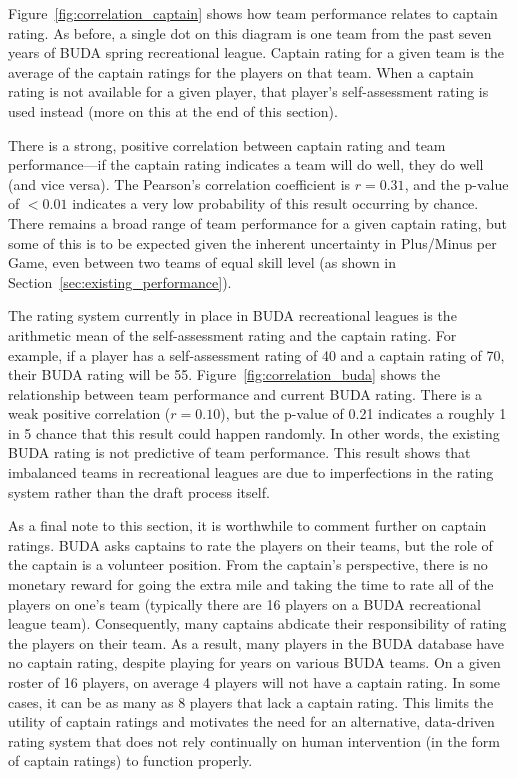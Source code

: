 Figure~\ref{fig:correlation_captain} shows how team performance relates to captain rating.  As before, a single dot on this diagram is one team from the past seven years of BUDA spring recreational league.  Captain rating for a given team is the average of the captain ratings for the players on that team. When a captain rating is not available for a given player, that player's self-assessment rating is used instead (more on this at the end of this section).

There is a strong, positive correlation between captain rating and team performance---if the captain rating indicates a team will do well, they do well (and vice versa). The Pearson's correlation coefficient is $r = 0.31$, and the p-value of $<0.01$ indicates a very low probability of this result occurring by chance. There remains a broad range of team performance for a given captain rating, but some of this is to be expected given the inherent uncertainty in Plus/Minus per Game, even between two teams of equal skill level (as shown in Section~\ref{sec:existing_performance}).

The rating system currently in place in BUDA recreational leagues is the arithmetic mean of the self-assessment rating and the captain rating.  For example, if a player has a self-assessment rating of 40 and a captain rating of 70, their BUDA rating will be 55. Figure~\ref{fig:correlation_buda} shows the relationship between team performance and current BUDA rating. There is a weak positive correlation ($r = 0.10$), but the p-value of 0.21 indicates a roughly 1 in 5 chance that this result could happen randomly.  In other words, the existing BUDA rating is not predictive of team performance. This result shows that imbalanced teams in recreational leagues are due to imperfections in the rating system rather than the draft process itself.

As a final note to this section, it is worthwhile to comment further on captain ratings. BUDA asks captains to rate the players on their teams, but the role of the captain is a volunteer position. From the captain's perspective, there is no monetary reward for going the extra mile and taking the time to rate all of the players on one's team (typically there are 16 players on a BUDA recreational league team). Consequently, many captains abdicate their responsibility of rating the players on their team. As a result, many players in the BUDA database have no captain rating, despite playing for years on various BUDA teams. On a given roster of 16 players, on average 4 players will not have a captain rating.  In some cases, it can be as many as 8 players that lack a captain rating. This limits the utility of captain ratings and motivates the need for an alternative, data-driven rating system that does not rely continually on human intervention (in the form of captain ratings) to function properly.
